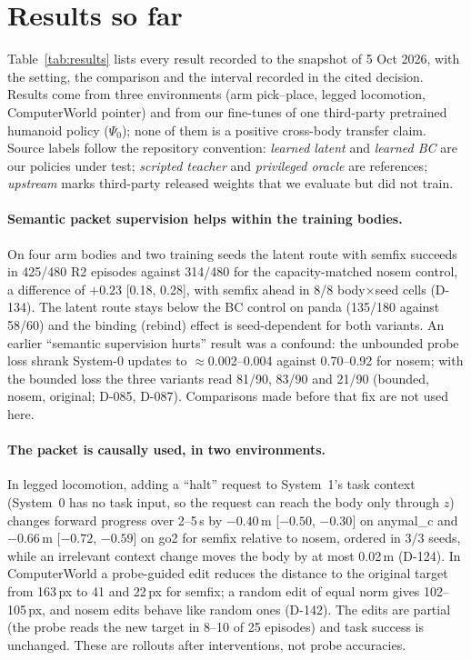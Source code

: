 \documentclass[10pt,twocolumn]{article}
\begin{document}
\section{Results so far}\label{sec:results}
Table~\ref{tab:results} lists every result recorded to the snapshot of 5 Oct 2026, with the setting, the comparison and the interval recorded in the cited decision. Results come from three environments (arm pick--place, legged locomotion, ComputerWorld pointer) and from our fine-tunes of one third-party pretrained humanoid policy ($\Psi_0$); none of them is a positive cross-body transfer claim. Source labels follow the repository convention: \emph{learned latent} and \emph{learned BC} are our policies under test; \emph{scripted teacher} and \emph{privileged oracle} are references; \emph{upstream} marks third-party released weights that we evaluate but did not train.

\paragraph{Semantic packet supervision helps within the training bodies.} On four arm bodies and two training seeds the latent route with semfix succeeds in 425/480 R2 episodes against 314/480 for the capacity-matched nosem control, a difference of $+0.23$ [0.18, 0.28], with semfix ahead in 8/8 body$\times$seed cells (D-134). The latent route stays below the BC control on panda (135/180 against 58/60) and the binding (rebind) effect is seed-dependent for both variants. An earlier ``semantic supervision hurts'' result was a confound: the unbounded probe loss shrank System-0 updates to $\approx$0.002--0.004 against 0.70--0.92 for nosem; with the bounded loss the three variants read 81/90, 83/90 and 21/90 (bounded, nosem, original; D-085, D-087). Comparisons made before that fix are not used here.

\paragraph{The packet is causally used, in two environments.} In legged locomotion, adding a ``halt'' request to System~1's task context (System~0 has no task input, so the request can reach the body only through $z$) changes forward progress over 2--5\,s by $-0.40$\,m [$-0.50$, $-0.30$] on anymal\_c and $-0.66$\,m [$-0.72$, $-0.59$] on go2 for semfix relative to nosem, ordered in 3/3 seeds, while an irrelevant context change moves the body by at most 0.02\,m (D-124). In ComputerWorld a probe-guided edit reduces the distance to the original target from 163\,px to 41 and 22\,px for semfix; a random edit of equal norm gives 102--105\,px, and nosem edits behave like random ones (D-142). The edits are partial (the probe reads the new target in 8--10 of 25 episodes) and task success is unchanged. These are rollouts after interventions, not probe accuracies.
\end{document}

